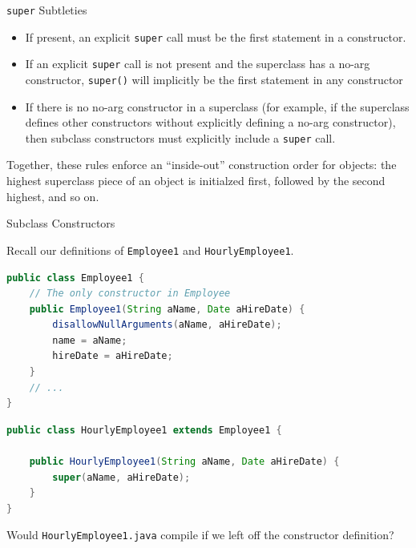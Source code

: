 \documentclass{beamer}
\begin{document}
\begin{frame}[fragile]{{\tt super} Subtleties}


\begin{itemize}
\item If present, an explicit {\tt super} call must be the first statement in a constructor.
\item If an explicit {\tt super} call is not present and the superclass has a no-arg constructor, {\tt super()} will implicitly be the first statement in any constructor
\item If there is no no-arg constructor in a superclass (for example, if the superclass defines other constructors without explicitly defining a no-arg constructor), then subclass constructors must explicitly include a {\tt super} call.
\end{itemize}
Together, these rules enforce an ``inside-out'' construction order for objects: the highest superclass piece of an object is initialzed first, followed by the second highest, and so on.

\end{frame}

\begin{frame}[fragile]{Subclass Constructors}


Recall our definitions of {\tt Employee1} and {\tt HourlyEmployee1}.
\begin{lstlisting}[language=Java]
public class Employee1 {
    // The only constructor in Employee
    public Employee1(String aName, Date aHireDate) {
        disallowNullArguments(aName, aHireDate);
        name = aName;
        hireDate = aHireDate;
    }
    // ...
}
\end{lstlisting}

\begin{lstlisting}[language=Java]
public class HourlyEmployee1 extends Employee1 {

    public HourlyEmployee1(String aName, Date aHireDate) {
        super(aName, aHireDate);
    }
}
\end{lstlisting}

Would {\tt HourlyEmployee1.java} compile if we left off the constructor definition?

\end{frame}
\end{document}
